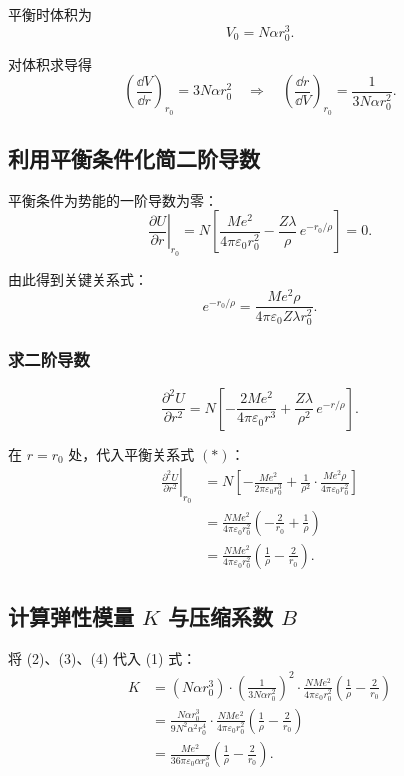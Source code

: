 平衡时体积为
\[
  V_0 = N\alpha r_0^3. \tag{2}
\]

对体积求导得
\[
  \left(\frac{\dd V}{\dd r}\right)_{r_0} = 3N\alpha r_0^2
  \quad\Longrightarrow\quad
  \left(\frac{\dd r}{\dd V}\right)_{r_0} = \frac{1}{3N\alpha r_0^2}. \tag{3}
\]

\subsection{利用平衡条件化简二阶导数}

平衡条件为势能的一阶导数为零：
\[
  \left.\frac{\partial U}{\partial r}\right|_{r_0}
  = N\left[\frac{Me^2}{4\pi\varepsilon_0 r_0^2} - \frac{Z\lambda}{\rho}\,e^{-r_0/\rho}\right] = 0.
\]

由此得到关键关系式：
\[
  \boxed{ e^{-r_0/\rho} = \frac{Me^2\rho}{4\pi\varepsilon_0 Z\lambda r_0^2} }. \tag{*}
\]

\subsubsection{求二阶导数}

\[
  \frac{\partial^2 U}{\partial r^2}
  = N\left[-\frac{2Me^2}{4\pi\varepsilon_0 r^3} + \frac{Z\lambda}{\rho^2}\,e^{-r/\rho}\right].
\]

在 $r = r_0$ 处，代入平衡关系式 $(*)$：
\begin{align*}
  \left.\frac{\partial^2 U}{\partial r^2}\right|_{r_0}
  &= N\left[-\frac{Me^2}{2\pi\varepsilon_0 r_0^3}
       + \frac{1}{\rho^2}\cdot\frac{Me^2\rho}{4\pi\varepsilon_0 r_0^2}\right] \\
  &= \frac{NMe^2}{4\pi\varepsilon_0 r_0^2}\left(-\frac{2}{r_0} + \frac{1}{\rho}\right) \\
  &= \frac{NMe^2}{4\pi\varepsilon_0 r_0^2}\left(\frac{1}{\rho} - \frac{2}{r_0}\right). \tag{4}
\end{align*}

\subsection{计算弹性模量 $K$ 与压缩系数 $B$}

将 (2)、(3)、(4) 代入 (1) 式：
\begin{align*}
  K &= (N\alpha r_0^3)\cdot\left(\frac{1}{3N\alpha r_0^2}\right)^2
      \cdot\frac{NMe^2}{4\pi\varepsilon_0 r_0^2}\left(\frac{1}{\rho} - \frac{2}{r_0}\right) \\
    &= \frac{N\alpha r_0^3}{9N^2\alpha^2 r_0^4}
      \cdot\frac{NMe^2}{4\pi\varepsilon_0 r_0^2}\left(\frac{1}{\rho} - \frac{2}{r_0}\right) \\
    &= \frac{Me^2}{36\pi\varepsilon_0\alpha r_0^3}
      \left(\frac{1}{\rho} - \frac{2}{r_0}\right).
\end{align*}

